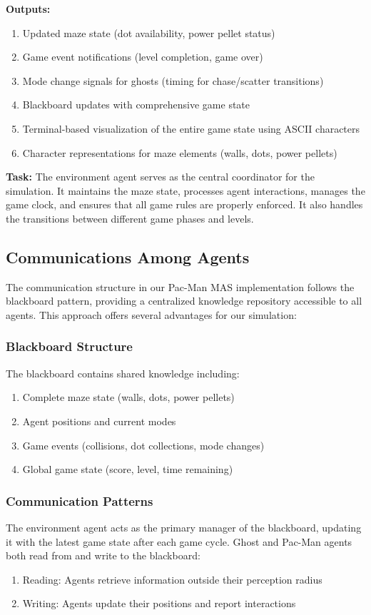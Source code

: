 \documentclass[a4paper, 11pt]{article}
\begin{document}
\textbf{Outputs:}
\begin{enumerate}
    \item Updated maze state (dot availability, power pellet status)
    \item Game event notifications (level completion, game over)
    \item Mode change signals for ghosts (timing for chase/scatter transitions)
    \item Blackboard updates with comprehensive game state
    \item Terminal-based visualization of the entire game state using ASCII characters
    \item Character representations for maze elements (walls, dots, power pellets)
\end{enumerate}

\textbf{Task:} The environment agent serves as the central coordinator for the simulation. It maintains the maze state, processes agent interactions, manages the game clock, and ensures that all game rules are properly enforced. It also handles the transitions between different game phases and levels.

\subsection{Communications Among Agents}

The communication structure in our Pac-Man MAS implementation follows the blackboard pattern, providing a centralized knowledge repository accessible to all agents. This approach offers several advantages for our simulation:

\subsubsection{Blackboard Structure}
The blackboard contains shared knowledge including:
\begin{enumerate}
    \item Complete maze state (walls, dots, power pellets)
    \item Agent positions and current modes
    \item Game events (collisions, dot collections, mode changes)
    \item Global game state (score, level, time remaining)
\end{enumerate}

\subsubsection{Communication Patterns}
The environment agent acts as the primary manager of the blackboard, updating it with the latest game state after each game cycle. Ghost and Pac-Man agents both read from and write to the blackboard:
\begin{enumerate}
    \item Reading: Agents retrieve information outside their perception radius
    \item Writing: Agents update their positions and report interactions
\end{enumerate}
\end{document}

